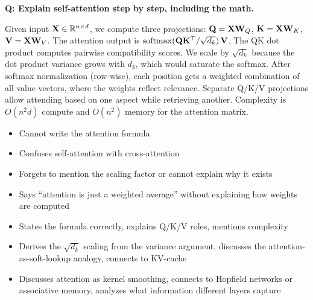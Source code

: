 \begin{interviewq}
\textbf{Q: Explain self-attention step by step, including the math.}

 \quad {} \quad \badgefreq{\freqhigh}

\stronganswer
Given input $\mathbf{X} \in \mathbb{R}^{n \times d}$, we compute three projections:
$\mathbf{Q} = \mathbf{X}\mathbf{W}_Q$, $\mathbf{K} = \mathbf{X}\mathbf{W}_K$, $\mathbf{V} = \mathbf{X}\mathbf{W}_V$.  The attention output
is $\operatorname{softmax}(\mathbf{Q}\mathbf{K}^\top / \sqrt{d_k})\,\mathbf{V}$.  The QK dot product computes
pairwise compatibility scores.  We scale by $\sqrt{d_k}$ because the dot
product variance grows with $d_k$, which would saturate the softmax.  After
softmax normalization (row-wise), each position gets a weighted combination of
all value vectors, where the weights reflect relevance.  Separate Q/K/V
projections allow attending based on one aspect while retrieving another.
Complexity is $O(n^2 d)$ compute and $O(n^2)$ memory for the attention matrix.

\redflags
\begin{itemize}
    \item Cannot write the attention formula
    \item Confuses self-attention with cross-attention
    \item Forgets to mention the scaling factor or cannot explain why it exists
    \item Says ``attention is just a weighted average'' without explaining how
          weights are computed
\end{itemize}


\goodgreat
\begin{itemize}
    \item {} States the formula correctly, explains Q/K/V roles,
          mentions complexity
    \item {} Derives the $\sqrt{d_k}$ scaling from the variance
          argument, discusses the attention-as-soft-lookup analogy, connects to
          KV-cache
    \item {} Discusses attention as kernel smoothing, connects to
          Hopfield networks or associative memory, analyzes what information
          different layers capture
\end{itemize}

\end{interviewq}

